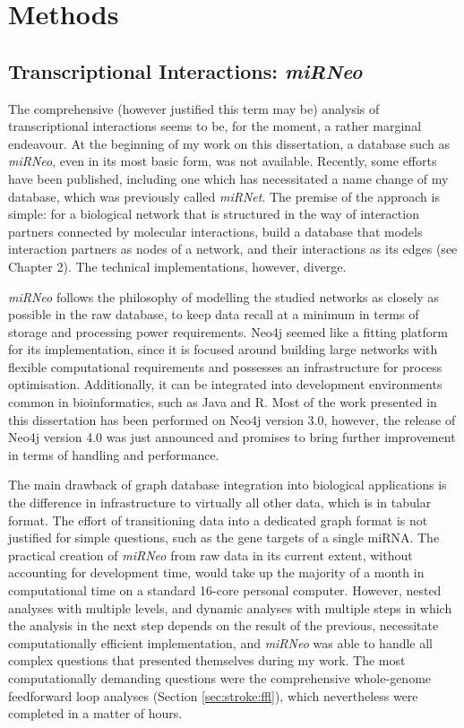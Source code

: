 \section{Methods} \label{sec:discussion:methods}

\subsection{Transcriptional Interactions: \emph{miRNeo}} \label{sec:discussion:mirneo}
The comprehensive (however justified this term may be) analysis of transcriptional interactions seems to be, for the moment, a rather marginal endeavour. At the beginning of my work on this dissertation, a database such as \emph{miRNeo}, even in its most basic form, was not available. Recently, some efforts have been published,\cite{Fan2016, Tokar2018} including one which has necessitated a name change of my database, which was previously called \emph{miRNet}.\cite{Lobentanzer2019a, Fan2016} The premise of the approach is simple: for a biological network that is structured in the way of interaction partners connected by molecular interactions, build a database that models interaction partners as nodes of a network, and their interactions as its edges (see Chapter 2). The technical implementations, however, diverge.

\emph{miRNeo} follows the philosophy of modelling the studied networks as closely as possible in the raw database, to keep data recall at a minimum in terms of storage and processing power requirements. Neo4j seemed like a fitting platform for its implementation, since it is focused around building large networks with flexible computational requirements and possesses an infrastructure for process optimisation. Additionally, it can be integrated into development environments common in bioinformatics, such as Java and R. Most of the work presented in this dissertation has been performed on Neo4j version 3.0, however, the release of Neo4j version 4.0 was just announced and promises to bring further improvement in terms of handling and performance.\cite{Neo4j2020}

The main drawback of graph database integration into biological applications is the difference in infrastructure to virtually all other data, which is in tabular format. The effort of transitioning data into a dedicated graph format is not justified for simple questions, such as the gene targets of a single miRNA. The practical creation of \emph{miRNeo} from raw data in its current extent, without accounting for development time, would take up the majority of a month in computational time on a standard 16-core personal computer. However, nested analyses with multiple levels, and dynamic analyses with multiple steps in which the analysis in the next step depends on the result of the previous, necessitate computationally efficient implementation, and \emph{miRNeo} was able to handle all complex questions that presented themselves during my work. The most computationally demanding questions were the comprehensive whole-genome feedforward loop analyses (Section \ref{sec:stroke:ffl}), which nevertheless were completed in a matter of hours.

